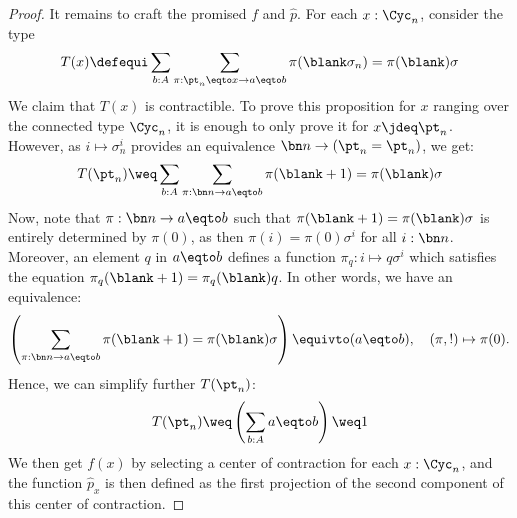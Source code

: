 \begin{proof}
  It remains to craft the promised $f$ and $\hat p$. For each $x:\Cyc_n$, consider the type
  \begin{displaymath}
    T(x) \defequi \sum_{b:A}\sum_{\pi: \pt_n \eqto x \to a \eqto b}
    \pi(\blank\sigma_n) = \pi(\blank) \sigma
  \end{displaymath}
  We claim that $T(x)$ is contractible. To prove this proposition for $x$
  ranging over the connected type $\Cyc_n$, it is enough to only prove it for
  $x \jdeq \pt_n$. However, as $i \mapsto \sigma_n^i$ provides an equivalence
  $\bn n \to (\pt_n = \pt_n)$, we get:
  \begin{displaymath}
    T(\pt_n) \weq \sum_{b:A}\sum_{\pi: \bn n \to a \eqto b} \pi(\blank + 1) = \pi(\blank)\sigma
  \end{displaymath}
  Now, note that $\pi:\bn n \to a\eqto b$ such that $\pi(\blank +1) = \pi(\blank)
  \sigma$ is entirely determined by $\pi(0)$, as then $\pi(i) = \pi(0)\sigma^i$
  for all $i:\bn n$. Moreover, an element $q$ in $a\eqto b$ defines a function
  $\pi_q:i \mapsto q\sigma^i$ which satisfies the equation $\pi_q( \blank +1) =
  \pi_q(\blank)q$. In other words, we have an equivalence:
  \begin{displaymath}
    \left( \sum_{\pi:\bn n \to {a\eqto b}} \pi(\blank +1) = \pi(\blank )\sigma \right)
    \equivto
    (a \eqto b), \quad
    (\pi, !) \mapsto \pi(0).
  \end{displaymath}
  Hence, we can simplify further $T(\pt_n)$:
  \begin{displaymath}
    T(\pt_n) \weq \left(\sum_{b:A} a \eqto b\right) \weq 1
  \end{displaymath}
  We then get $f(x)$ by selecting a center of contraction for each $x:\Cyc_n$, and
  the function $\hat p_x$ is then defined as the first projection of the second
  component of this center of contraction.



\end{proof}
